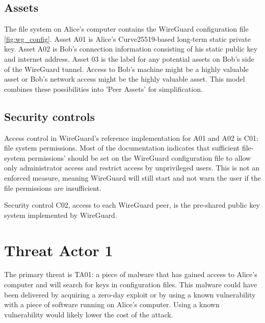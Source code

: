 \documentclass [11pt, proquest] {uwthesis}[2020/02/24]
\begin{document}
\subsection{Assets}
The file system on Alice's computer contains the WireGuard configuration file \ref{fig:wg_config}. 
Asset A01 is Alice's Curve25519-based long-term static private key. Asset A02 is Bob's connection information consisting of his static public key and internet address. 
Asset 03 is the label for any potential assets on Bob's side of the WireGuard tunnel. Access to Bob's machine might be a highly valuable asset or Bob's network access might be the highly valuable asset. This model combines these possibilities into 'Peer Assets' for simplification.

\subsection{Security controls}
Access control in WireGuard's reference implementation for A01 and A02 is C01: file system permissions. Most of the documentation indicates that sufficient file-system permissions' should be set on the WireGuard configuration file to allow only administrator access and restrict access by unprivileged users. This is not an enforced measure, meaning WireGuard will still start and not warn the user if the file permissions are insufficient. 

Security control C02, access to each WireGuard peer, is the pre-shared public key system implemented by WireGuard.

\section{Threat Actor 1}
The primary threat is TA01: a piece of malware that has gained access to Alice's computer and will search for keys in configuration files. This malware could have been delivered by acquiring a zero-day exploit or by using a known vulnerability with a piece of software running on Alice's computer. Using a known vulnerability would likely lower the cost of the attack.
\end{document}
